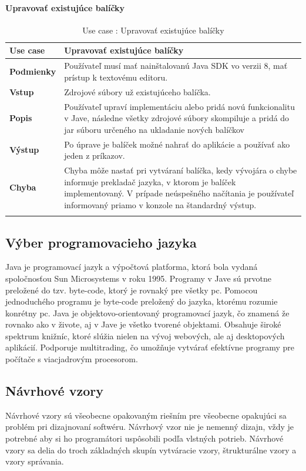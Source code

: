 \paragraph{Upravovať existujúce balíčky}
\begin{center}
	\begin{longtable}{|p{2.5cm}|p{12.2cm}|}
		
			\hline
			\textbf{Use case} & Upravovať existujúce balíčky \\ 
			\hline
			\textbf{Podmienky} &  Používateľ musí mať nainštalovanú Java SDK vo verzii 8, mať prístup k textovému editoru.  \\ 
			\hline
			\textbf{Vstup} & Zdrojové súbory už existujúceho balíčka.\\
			\hline
			\textbf{Popis} & Používateľ upraví implementáciu alebo pridá novú funkcionalitu v Jave, následne všetky zdrojové súbory skompiluje a pridá do \acrshort{jar} súboru určeného na ukladanie nových balíčkov\\ 
			\hline
			\textbf{Výstup} & Po úprave je balíček možné nahrať do aplikácie a používať ako jeden z príkazov.\\
			\hline
			\textbf{Chyba} & Chyba môže nastať pri vytváraní balíčka, kedy vývojára o chybe informuje prekladač jazyka, v ktorom je balíček implementovaný. V prípade neúspešného načítania je používateľ informovaný priamo v konzole na štandardný výstup.\\
			\hline
		\caption{Use case : Upravovať existujúce balíčky}
		\label{table:1}
		
	\end{longtable}
\end{center}
\subsection{Výber programovacieho jazyka}
\indent Java je programovací jazyk a výpočtová platforma, ktorá bola vydaná spoločnosťou Sun Microsystems v roku 1995. \cite{java} 
Programy v Jave sú prvotne preložené do tzv. byte-code, ktorý je rovnaký pre všetky \acrshort{pc}. Pomocou jednoduchého programu je byte-code preložený do jazyka, ktorému rozumie konrétny \acrshort{pc}.
Java je objektovo-orientovaný programovací jazyk, čo znamená že rovnako ako v živote, aj v Jave je všetko tvorené objektami. Obsahuje široké spektrum knižníc, ktoré slúžia nielen na vývoj webových, ale aj desktopových aplikácií.
Podporuje multitrading, čo umožňuje vytvárať efektívne programy pre počítače s viacjadrovým procesorom.\cite{javabook}
\subsection{Návrhové vzory}
\indent Návrhové vzory sú všeobecne opakovaným riešním pre všeobecne opakujúci sa problém pri dizajnovaní softwéru. Návrhový vzor nie je nemenný dizajn, vždy je potrebné aby si ho programátori uspôsobili podľa vlstných potrieb. Návrhové vzory sa delia do troch základných skupín vytváracie vzory, štrukturálne vzory a vzory správania. 

